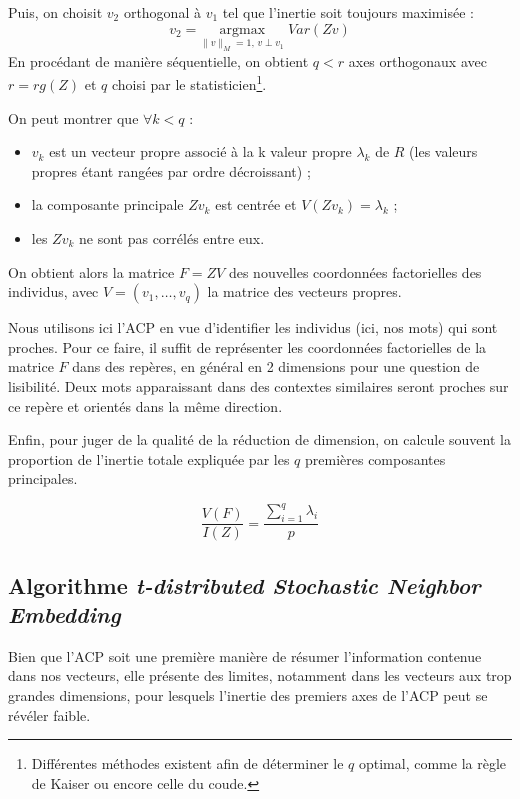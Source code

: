 \documentclass[11pt,french,french]{article}
\providecommand{\tightlist}{%
  \setlength{\parskip}{0pt}
  }
\let\rmarkdownfootnote\footnote%
\def\footnote{\protect\rmarkdownfootnote}
\begin{document}
Puis, on choisit \(v_2\) orthogonal à \(v_1\) tel que l'inertie soit
toujours maximisée : \[
v_2 =\underset{ \| v \|_M = 1,\,v \perp v_1}{\mathrm{argmax}}\;  Var(Zv)
\] En procédant de manière séquentielle, on obtient \(q < r\) axes
orthogonaux avec \(r = rg(Z)\) et \(q\) choisi par le
statisticien\footnote{Différentes méthodes existent afin de déterminer
  le \(q\) optimal, comme la règle de Kaiser ou encore celle du coude.}.

On peut montrer que \(\forall k < q\) :

\begin{itemize}
\tightlist
\item
  \(v_k\) est un vecteur propre associé à la k\ieme{} valeur propre
  \(\lambda_k\) de \(R\) (les valeurs propres étant rangées par ordre
  décroissant) ;
\item
  la composante principale \(Zv_k\) est centrée et
  \(V(Zv_k)= \lambda_k\) ;
\item
  les \(Zv_k\) ne sont pas corrélés entre eux.
\end{itemize}

On obtient alors la matrice \(F = ZV\) des nouvelles coordonnées
factorielles des individus, avec \(V = (v_1,\dots,v_q)\) la matrice des
vecteurs propres.

Nous utilisons ici l'ACP en vue d'identifier les individus (ici, nos
mots) qui sont proches. Pour ce faire, il suffit de représenter les
coordonnées factorielles de la matrice \(F\) dans des repères, en
général en 2 dimensions pour une question de lisibilité. Deux mots
apparaissant dans des contextes similaires seront proches sur ce repère
et orientés dans la même direction.

Enfin, pour juger de la qualité de la réduction de dimension, on calcule
souvent la proportion de l'inertie totale expliquée par les \(q\)
premières composantes principales.

\[ \frac{V(F)}{I(Z)} = \frac{\sum \limits_{i = 1}^q \lambda_i}{p}\]

\subsection{\texorpdfstring{Algorithme \emph{t-distributed Stochastic
Neighbor
Embedding}}{Algorithme t-distributed Stochastic Neighbor Embedding}}\label{algorithme-t-distributed-stochastic-neighbor-embedding}

Bien que l'ACP soit une première manière de résumer l'information
contenue dans nos vecteurs, elle présente des limites, notamment dans
les vecteurs aux trop grandes dimensions, pour lesquels l'inertie des
premiers axes de l'ACP peut se révéler faible.
\end{document}
